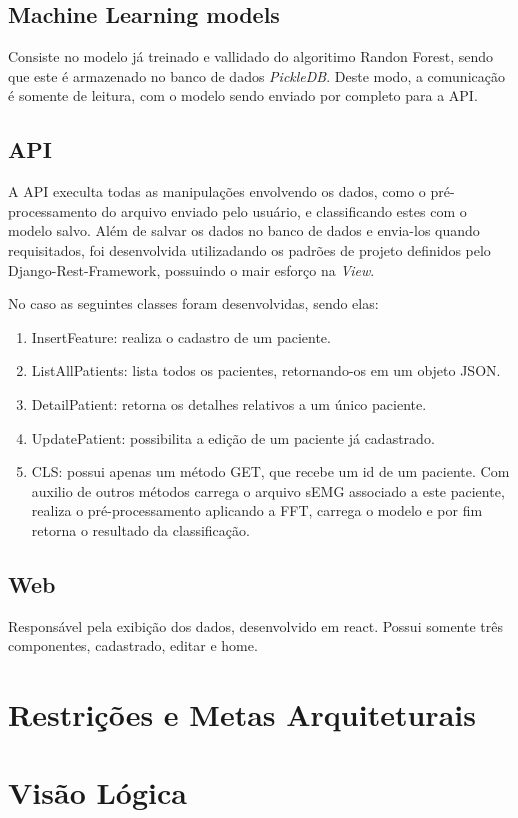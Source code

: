 \begin{anexosenv}
	\subsection{Machine Learning models}
	Consiste no modelo já treinado e vallidado do algoritimo Randon Forest, sendo que este é armazenado no banco de dados \textit{PickleDB}. Deste modo, a comunicação é somente de leitura, com o modelo sendo enviado por completo para a API.
	\subsection{API}
	A API execulta todas as manipulações envolvendo os dados, como o pré-processamento do arquivo enviado pelo usuário, e classificando estes com o modelo salvo. Além de salvar os dados no banco de dados e envia-los quando requisitados, foi desenvolvida utilizadando os padrões de projeto definidos pelo Django-Rest-Framework, possuindo o mair esforço na \textit{View}.

	No caso as seguintes classes foram desenvolvidas, sendo elas:
	\begin{enumerate}
		\item InsertFeature: realiza o cadastro de um paciente.
		\item ListAllPatients: lista todos os pacientes, retornando-os em um objeto JSON.
		\item DetailPatient: retorna os detalhes relativos a um único paciente.
		\item UpdatePatient: possibilita a edição de um paciente já cadastrado.
		\item CLS: possui apenas um método GET, que recebe um id de um paciente. Com auxilio de outros métodos carrega o arquivo sEMG associado a este paciente, realiza o pré-processamento aplicando a FFT, carrega o modelo e por fim retorna o resultado da classificação.
	\end{enumerate}

	\subsection{Web}
	Responsável pela exibição dos dados, desenvolvido em react. Possui somente três componentes, cadastrado, editar e home.

	\section{Restrições e Metas Arquiteturais}
	\section{Visão Lógica}

\end{anexosenv}
